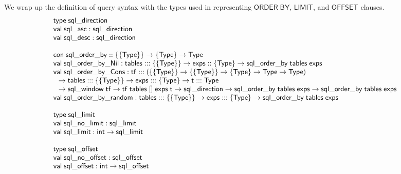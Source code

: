 \documentclass{article}
\newcommand{\mt}[1]{\mathsf{#1}}
\begin{document}
We wrap up the definition of query syntax with the types used in representing $\mt{ORDER} \; \mt{BY}$, $\mt{LIMIT}$, and $\mt{OFFSET}$ clauses.
$$\begin{array}{l}
  \mt{type} \; \mt{sql\_direction} \\
  \mt{val} \; \mt{sql\_asc} : \mt{sql\_direction} \\
  \mt{val} \; \mt{sql\_desc} : \mt{sql\_direction} \\
  \\
  \mt{con} \; \mt{sql\_order\_by} :: \{\{\mt{Type}\}\} \to \{\mt{Type}\} \to \mt{Type} \\
  \mt{val} \; \mt{sql\_order\_by\_Nil} : \mt{tables} ::: \{\{\mt{Type}\}\} \to \mt{exps} :: \{\mt{Type}\} \to \mt{sql\_order\_by} \; \mt{tables} \; \mt{exps} \\
  \mt{val} \; \mt{sql\_order\_by\_Cons} : \mt{tf} ::: (\{\{\mt{Type}\}\} \to \{\{\mt{Type}\}\} \to \{\mt{Type}\} \to \mt{Type} \to \mt{Type}) \\
  \hspace{.1in} \to \mt{tables} ::: \{\{\mt{Type}\}\} \to \mt{exps} ::: \{\mt{Type}\} \to \mt{t} ::: \mt{Type} \\
  \hspace{.1in} \to \mt{sql\_window} \; \mt{tf} \to \mt{tf} \; \mt{tables} \; [] \; \mt{exps} \; \mt{t} \to \mt{sql\_direction} \to \mt{sql\_order\_by} \; \mt{tables} \; \mt{exps} \to \mt{sql\_order\_by} \; \mt{tables} \; \mt{exps} \\
  \mt{val} \; \mt{sql\_order\_by\_random} : \mt{tables} ::: \{\{\mt{Type}\}\} \to \mt{exps} ::: \{\mt{Type}\} \to \mt{sql\_order\_by} \; \mt{tables} \; \mt{exps} \\
  \\
  \mt{type} \; \mt{sql\_limit} \\
  \mt{val} \; \mt{sql\_no\_limit} : \mt{sql\_limit} \\
  \mt{val} \; \mt{sql\_limit} : \mt{int} \to \mt{sql\_limit} \\
  \\
  \mt{type} \; \mt{sql\_offset} \\
  \mt{val} \; \mt{sql\_no\_offset} : \mt{sql\_offset} \\
  \mt{val} \; \mt{sql\_offset} : \mt{int} \to \mt{sql\_offset}
\end{array}$$
\end{document}
